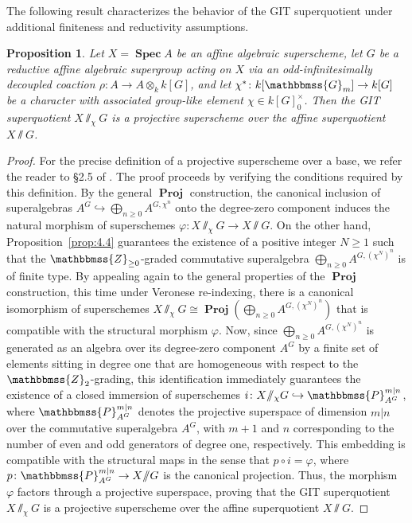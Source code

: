 \documentclass[11pt,a4paper,reqno,noamsfonts]{amsart}
\numberwithin{equation}{section}
\newtheorem{proposition}[theorem]{Proposition}
\theoremstyle{definition}
\theoremstyle{remark}
\newcommand{\GG}{\ensuremath{\mathbbmss{G}}}
\newcommand{\PP}{\ensuremath{\mathbbmss{P}}}
\newcommand{\ZZ}{\ensuremath{\mathbbmss{Z}}}
\DeclareMathOperator{\sSpec}{\mathbf{Spec}}
\DeclareMathOperator{\sProj}{\mathbf{Proj}}
\begin{document}
The following result characterizes the behavior of the GIT superquotient under additional finiteness and reductivity assumptions.

\begin{proposition}\label{prop:4.6}
Let $X = \sSpec A$ be an affine algebraic superscheme, let $G$ be a reductive affine algebraic supergroup acting on $X$ via an odd-infinitesimally decoupled coaction $\rho \colon A \to A \otimes_k k[G]$, and let $\chi^{*} \colon k[\GG_m] \to k[G]$ be a character with associated group-like element $\chi \in k[G]_0^{\times}$. Then the GIT superquotient $X {\sslash_{\chi}} G$ is a projective superscheme over the affine superquotient $X {\sslash} G$. 
\end{proposition}

\begin{proof}
For the precise definition of a projective superscheme over a base, we refer the reader to \S2.5 of \cite{BruzzoHernandezRuiperezPolishchuk2023}. The proof proceeds by verifying the conditions required by this definition. By the general $\sProj$ construction, the canonical inclusion of superalgebras $A^G \hookrightarrow \bigoplus_{n \geq 0} A^{G,\chi^{n}}$ onto the degree-zero component induces the natural morphism of superschemes $\varphi \colon X {\sslash_{\chi}} G \to X {\sslash} G$. On the other hand, Proposition~\ref{prop:4.4} guarantees the existence of a positive integer $N \geq 1$ such that the $\ZZ_{\ge 0}$-graded commutative superalgebra $\bigoplus_{n \geq 0} A^{G,(\chi^{N})^{n}}$ is of finite type. By appealing again to the general properties of the $\sProj$ construction, this time under Veronese re-indexing, there is a canonical isomorphism of superschemes $X {\sslash_{\chi}} G \cong \sProj(\bigoplus_{n \geq 0} A^{G,(\chi^{N})^{n}})$ that is compatible with the structural morphism $\varphi$.  Now, since $\bigoplus_{n \geq 0} A^{G,(\chi^{N})^{n}}$ is generated as an algebra over its degree-zero component $A^{G}$ by a finite set of elements sitting in degree one that are homogeneous with respect to the $\ZZ_{2}$-grading, this identification immediately guarantees the existence of a closed immersion of superschemes $i \colon X {\sslash_{\chi}} G \hookrightarrow \PP^{m \vert n}_{A^G}$, where $\PP_{A^{G}}^{m \vert n}$ denotes the projective superspace of dimension $m \vert n$ over the commutative superalgebra $A^{G}$, with $m+1$ and $n$ corresponding to the number of even and odd generators of degree one, respectively. This embedding is compatible with the structural maps in the sense that $p \circ i = \varphi$, where $p \colon \PP^{m \vert n}_{A^G} \to X {\sslash} G$ is the canonical projection. Thus, the morphism $\varphi$ factors through a projective superspace, proving that the GIT superquotient $X {\sslash_{\chi}} G$ is a projective superscheme over the affine superquotient $X {\sslash} G$.
\end{proof}
\end{document}
